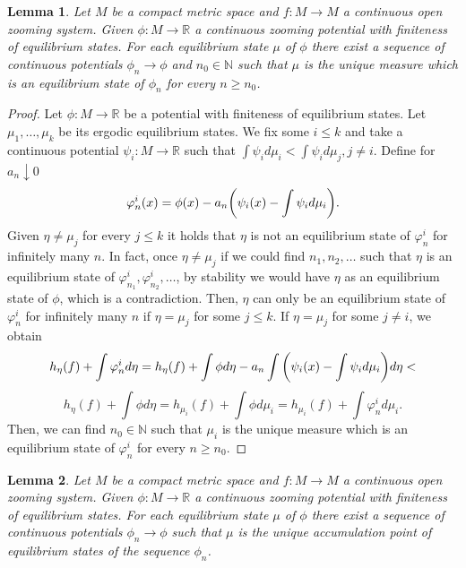\documentclass[12pt,a4paper]{amsart}
\theoremstyle{plain}
\newtheorem{lemma}{Lemma}[subsection]
\begin{document}
\begin{lemma}\label{sequence}
	Let $M$ be a compact metric space and $f: M \to M$ a continuous open zooming system. Given $\phi : M \to \mathbb{R}$ a continuous zooming potential with finiteness of equilibrium states. For each equilibrium state $\mu$ of $\phi$ there exist a sequence of continuous potentials $\phi_{n} \to \phi$ and $n_{0} \in \mathbb{N}$ such that $\mu$ is the unique measure which is an equilibrium state of $\phi_{n}$ for every $n \geq n_{0}$.
\end{lemma} 
\begin{proof}
	Let $\phi : M \to 
	\mathbb{R}$ be a potential with finiteness of equilibrium states. Let $\mu_{1}, \dots, \mu_{k}$ be its ergodic equilibrium states.  We fix some $i \leq k$ and take a continuous potential $\psi_{i} : M \to \mathbb{R}$  such that $\int\psi_{i} d\mu_{i} < \int \psi_{i} d\mu_{j}, j \neq i$. Define for $a_{n} \downarrow 0$
	\[
	\varphi_{n}^{i}(x) = \phi(x) - a_{n}\bigg{(}\psi_{i}(x) - \int \psi_{i} d\mu_{i}\bigg{)}.
	\]
	Given $\eta \neq \mu_{j}$ for every $j \leq k$ it holds that $\eta$ is not an equilibrium state of $\varphi_{n}^{i}$ for infinitely many $n$.  In fact, once $\eta \neq \mu_{j}$ if we could find $n_{1}, n_{2}, \dots$ such that $\eta$ is an equilibrium state of $\varphi_{n_{1}}^{i}, \varphi_{n_{2}}^{i}, \dots$, by stability we would have $\eta$ as an equilibrium state of $\phi$, which is a contradiction. Then, $\eta$ can only be an equilibrium state of $\varphi_{n}^{i}$ for infinitely many $n$ if $\eta = \mu_{j}$ for some $j \leq k$. If $\eta = \mu_{j}$ for some $j \neq i$, we obtain
	\[
	h_{\eta}(f) + \int \varphi_{n}^{i} d\eta = h_{\eta}(f) + \int \phi d\eta - a_{n}\int \bigg{(}\psi_{i}(x) - \int \psi_{i} d\mu_{i}\bigg{)} d \eta < 
	\]
	\[
	h_{\eta}(f) + \int \phi d\eta = h_{\mu_{i}}(f) + \int \phi d\mu_{i} = h_{\mu_{i}}(f) + \int \varphi_{n}^{i} d\mu_{i}.
	\]
	Then, we can find $n_{0} \in \mathbb{N}$ such that $\mu_{i}$ is the unique measure which is an equilibrium state of $\varphi_{n}^{i}$ for every $n \geq n_{0}$.  
\end{proof}
\begin{lemma}\label{accumulation}
	Let $M$ be a compact metric space and $f: M \to M$ a continuous open zooming system. Given $\phi : M \to \mathbb{R}$ a continuous zooming potential with finiteness of equilibrium states. For each equilibrium state $\mu$ of $\phi$ there exist a sequence of continuous potentials $\phi_{n} \to \phi$ such that $\mu$ is the unique accumulation point of equilibrium states of the sequence $\phi_{n}$.
\end{lemma} 
\end{document}
